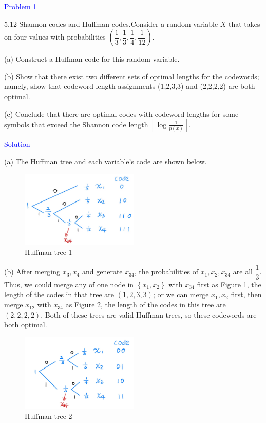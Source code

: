 \textcolor{blue}{Problem 1}

5.12 Shannon codes and Huffman codes.\quad Consider a random variable $X$ that takes on four values with probabilities $\left(\dfrac{1}{3},\dfrac{1}{3},\dfrac{1}{4},\dfrac{1}{12}\right)$.

(a) Construct a Huffman code for this random variable.

(b) Show that there exist two different sets of optimal lengths for the codewords; namely, show that codeword length assignments (1,2,3,3) and (2,2,2,2) are both optimal.

(c) Conclude that there are optimal codes with codeword lengths for some symbols that exceed the Shannon code length $\left\lceil\log\frac{1}{p(x)}\right\rceil$.

\textcolor{blue}{Solution}

(a) The Huffman tree and each variable's code are shown below.
\begin{figure}[htbp]
    \centering
	\includegraphics[width=0.5\textwidth]{../huffman1.png}
    \caption{Huffman tree 1}
    \label{fig:huffman1}
\end{figure}

(b) After merging $x_3,x_4$ and generate $x_{34}$, the probabilities of $x_1,x_2,x_{34}$ are all $\dfrac{1}{3}$. Thus, we could merge any of one node in $\left\{x_1,x_2\right\}$ with $x_{34}$ first as Figure \ref{fig:huffman1}, the length of the codes in that tree are $\left(1,2,3,3\right)$; or we can merge $x_1,x_2$ first, then merge $x_{12}$ with $x_{34}$ as Figure \ref{fig:huffman2}, the length of the codes in this tree are $\left(2,2,2,2\right)$. Both of these trees are valid Huffman trees, so these codewords are both optimal.

\begin{figure}[htbp]
    \centering
	\includegraphics[width=0.5\textwidth]{../huffman2.png}
    \caption{Huffman tree 2}
    \label{fig:huffman2}
\end{figure}

